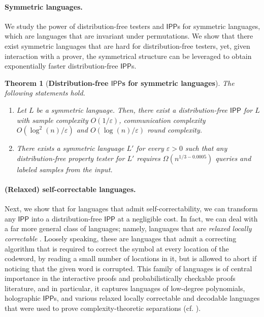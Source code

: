 \documentclass[10pt,a4paper]{article}
\newtheorem{theorem}{Theorem}[section]
\newcommand{\IPP}{\mathsf{IPP}}
\begin{document}
\paragraph{Symmetric languages.}
We study the power of distribution-free testers and $\IPP$s for symmetric languages, which are languages that are invariant under permutations. We show that there exist symmetric languages that are hard for distribution-free testers, yet, given interaction with a prover, the symmetrical structure can be leveraged to obtain exponentially faster distribution-free $\IPP$s.

\begin{theorem}[\textbf{Distribution-free $\IPP$s for symmetric languages}]
    \label{thm:informal_ham_sep}
The following statements hold.
\begin{enumerate}
    \item Let $L$ be a symmetric language. Then, there exist a distribution-free $\IPP$ for $L$ with sample complexity $O(1/\varepsilon)$, communication complexity $O(\log^{2}(n)/\varepsilon)$ and $O(\log(n)/\varepsilon)$ round complexity.
    \item There exists a symmetric language $L'$ for every $\varepsilon>0$ such that any distribution-free property tester for $L'$ requires $\Omega(n^{1/3-0.0005})$ queries and labeled samples from the input.
\end{enumerate}

\end{theorem}

\paragraph{(Relaxed) self-correctable languages.}
Next, we show that for languages that admit self-correctability, we can transform any $\IPP$ into a distribution-free $\IPP$ at a negligible cost. In fact, we can deal with a far more general class of languages; namely, languages that are \emph{relaxed locally correctable} \cite{BGHSV04,GRR20_rlcc}. Loosely speaking, these are languages that admit a correcting algorithm that is required to correct the symbol at every location of the codeword, by reading a small number of locations in it, but is allowed to abort if noticing that the given word is corrupted. This family of languages is of central importance in the interactive proofs and probabilistically checkable proofs literature, and in particular, it captures languages of low-degree polynomials, holographic $\IPP$s, and various relaxed locally correctable and decodable languages that were used to prove complexity-theoretic separations (cf. \cite{gur2017locally}).
\end{document}
